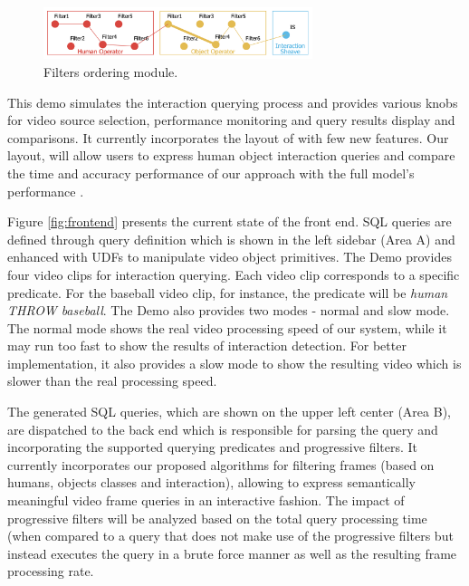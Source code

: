 \documentclass[sigconf]{acmart}
\begin{document}
\begin{figure}[t]
\centering
\includegraphics[width=0.7\textwidth]{graphs/filters.png}
\caption{Filters ordering module.}
\label{fig:filters}
\end{figure}

This demo simulates the interaction querying process and provides various knobs for video source selection, performance monitoring and query results display and comparisons. It currently incorporates the layout of \cite{Xarchakos2019} with few new features. Our layout, will allow users to express human object interaction queries and compare the time and accuracy performance of our approach with the full model's performance \cite{gkioxari2018detecting}. 

Figure \ref{fig:frontend} presents the current state of the front end. 
SQL queries are defined through query definition which is shown in the left sidebar (Area A) and enhanced with UDFs to manipulate video object primitives.  
The Demo provides four video clips for interaction querying. Each video clip corresponds to a specific predicate. For the baseball video clip, for instance, the predicate will be \emph{human THROW baseball}. 
The Demo also provides two modes - normal and slow mode. The normal mode shows the real video processing speed of our system, while it may run too fast to show the results of interaction detection. For better implementation, it also provides a slow mode to show the resulting video which is slower than the real processing speed. 

The generated SQL queries, which are shown on the upper left center (Area B), are dispatched to the back end which is responsible for parsing the query and incorporating the supported querying predicates and progressive filters. 
It currently incorporates our proposed algorithms for filtering frames (based on humans, objects classes and interaction), allowing to express semantically meaningful video frame queries in an interactive fashion. 
The impact of progressive filters will be analyzed based on the total query processing time (when compared to a query that does not make use of the progressive filters but instead executes the query in a brute force manner \cite{gkioxari2018detecting} as well as the resulting frame processing rate. 
\end{document}

